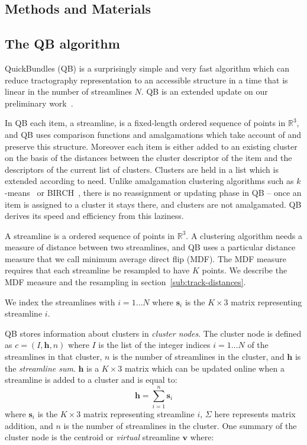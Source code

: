 \documentclass{bioinfo}
\begin{document}
\begin{methods}

\section{Methods and Materials}

\subsection{The QB algorithm\label{sub:QB-description}}

QuickBundles (QB) is a surprisingly simple and very fast algorithm which
can reduce tractography representation to an accessible structure in a
time that is linear in the number of streamlines $N$. QB is an extended
update on our preliminary work~\citet{EGMB10}.

In QB each item, a streamline, is a fixed-length ordered sequence of
points in $\mathbb{R}^{3}$, and QB uses comparison functions and
amalgamations which take account of and preserve this structure.
Moreover each item is either added to an existing cluster on the basis
of the distances between the cluster descriptor of the item and the
descriptors of the current list of clusters. Clusters are held in a list
which is extended according to need. Unlike amalgamation clustering
algorithms such as $k$-means~\citep{steinhaus1956division,
  macqueen1967some} or BIRCH~\citep{zhang1997birch}, there is no
reassignment or updating phase in QB -- once an item is assigned to a
cluster it stays there, and clusters are not amalgamated. QB derives its
speed and efficiency from this laziness.

A streamline is a ordered sequence of points in $\mathbb{R}^{3}$.  A
clustering algorithm needs a measure of distance between two
streamlines, and QB uses a particular distance measure that we call
minimum average direct flip (MDF).  The MDF measure requires that each
streamline be resampled to have $K$ points. We describe the MDF measure
and the resampling in section~\ref{sub:track-distances}.

We index the streamlines with $i = 1 \dots N$ where $\mathbf{s}_{i}$ is
the $K\times3$ matrix representing streamline $i$.

QB stores information about clusters in \emph{cluster nodes}.  The
cluster node is defined as $c=(I,\mathbf{h},n)$ where $I$ is the list of
the integer indices $i = 1 \dots N$ of the streamlines in that cluster,
$n$ is the number of streamlines in the cluster, and $\mathbf{h}$ is the
\emph{streamline sum}. $\mathbf{h}$ is a $K \times3$ matrix which can be
updated online when a streamline is added to a cluster and is equal to:
\begin{equation}
  \mathbf{h}=\sum_{i=1}^{n}\mathbf{s}_{i}
\end{equation} 
where $\mathbf{s}_{i}$ is the $K\times3$ matrix representing streamline $i$,
$\Sigma$ here represents matrix addition, and $n$ is the number of
streamlines in the cluster. One summary of the cluster node is the centroid or
\emph{virtual} streamline $\mathbf{v}$ where:


\end{methods}
\end{document}
